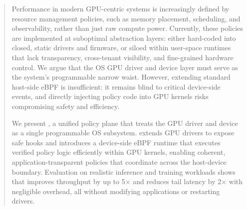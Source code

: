 \begin{abstract}
Performance in modern GPU-centric systems is increasingly defined by resource management policies, such as memory placement, scheduling, and observability, rather than just raw compute power. Currently, these policies are implemented at suboptimal abstraction layers: either hard-coded into closed, static drivers and firmware, or siloed within user-space runtimes that lack transparency, cross-tenant visibility, and fine-grained hardware control. We argue that the OS GPU driver and device layer must serve as the system's programmable narrow waist. However, extending standard host-side eBPF is insufficient: it remains blind to critical device-side events, and directly injecting policy code into GPU kernels risks compromising safety and efficiency.

We present \sys, a unified policy plane that treats the GPU driver and device as a single programmable OS subsystem. \sys extends GPU drivers to expose safe hooks and introduces a device-side eBPF runtime that executes verified policy logic efficiently within GPU kernels, enabling coherent, application-transparent policies that coordinate across the host-device boundary. Evaluation on realistic inference and training workloads shows that \sys improves throughput by up to  5× and reduces tail latency by 2× with negligible overhead, all without modifying applications or restarting drivers.
\end{abstract}

